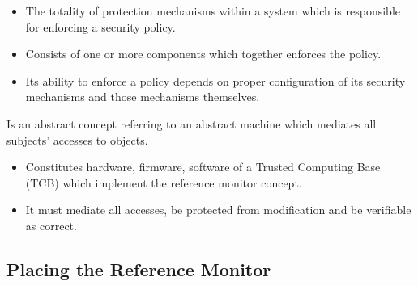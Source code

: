 \begin{frame}
  \begin{definition}
    \begin{itemize}
      \item The totality of protection mechanisms within a system which is 
        responsible for enforcing a security policy.
      \item Consists of one or more components which together enforces the 
        policy.
      \item Its ability to enforce a policy depends on proper configuration of 
        its security mechanisms and those mechanisms themselves.
    \end{itemize}
  \end{definition}
\end{frame}

\begin{frame}
  \begin{definition}
    Is an abstract concept referring to an abstract machine which mediates all 
    subjects' accesses to objects.
  \end{definition}

  \pause{}

  \begin{definition}
    \begin{itemize}
      \item Constitutes hardware, firmware, software of a Trusted Computing 
        Base (TCB) which implement the reference monitor concept.
      \item It must mediate all accesses, be protected from modification and be 
        verifiable as correct.
    \end{itemize}
  \end{definition}
\end{frame}


\subsection{Placing the Reference Monitor}

